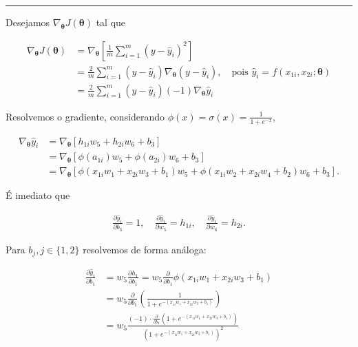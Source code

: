 \documentclass[
  a4paperpaper,
]{article}
\begin{document}
\begin{center}\rule{0.5\linewidth}{0.5pt}\end{center}

Desejamos \(\nabla_{\boldsymbol{\theta}}J(\boldsymbol{\theta})\) tal que

\begin{align}
  \nabla_{\boldsymbol{\theta}}J(\boldsymbol{\theta}) &= \nabla_{\boldsymbol{\theta}} \left[ \frac{1}{m} \sum\limits^m_{i = 1} (y - \hat{y}_i)^2 \right] \nonumber \\
  &= \frac{2}{m} \sum\limits^m_{i = 1} (y - \hat{y}_i) \nabla_{\boldsymbol{\theta}} (y - \hat{y}_i), \quad \text{pois } \hat{y}_i = f(x_{1i}, x_{2i}; \boldsymbol{\theta}) \nonumber \\
  &= \frac{2}{m} \sum\limits^m_{i = 1} (y - \hat{y}_i) (-1) \nabla_{\boldsymbol{\theta}} \hat{y}_i \label{101}
\end{align}

Resolvemos o gradiente, considerando
\(\phi(x) = \sigma(x) = \frac{1}{1+ e^{-x}}\),

\begin{align*}
  \nabla_{\boldsymbol{\theta}} \hat{y}_i &= \nabla_{\boldsymbol{\theta}} \left[ h_{1i} w_5 + h_{2i} w_6 + b_3 \right] \\
  &= \nabla_{\boldsymbol{\theta}} \left[ \phi(a_{1i}) w_5 + \phi(a_{2i}) w_6 + b_3 \right] \\
  &= \nabla_{\boldsymbol{\theta}} \left[ \phi(x_{1i} w_1 + x_{2i} w_3 + b_1) w_5 + \phi(x_{1i} w_2 + x_{2i} w_4 + b_2) w_6 + b_3 \right].
\end{align*}

É imediato que

\begin{align*}
  \frac{\partial \hat{y}_i}{\partial b_3} = 1, \quad \frac{\partial \hat{y}_i}{\partial w_5} = h_{1i}, \quad \frac{\partial \hat{y}_i}{\partial w_6} = h_{2i}.
\end{align*}

Para \(b_j, j \in \{1, 2\}\) resolvemos de forma análoga:

\begin{align*}
\frac{\partial \hat{y}_i}{\partial b_1} &= w_5 \frac{\partial h_1}{\partial b_1} = w_5 \frac{\partial}{\partial b_1} \phi(x_{1i} w_1 + x_{2i} w_3 + b_1) \\  
&= w_5 \frac{\partial}{\partial b_1} \left( \frac{1}{1+ e^{-(x_{1i} w_1 + x_{2i} w_3 + b_1)}} \right) \\  
&= w_5 \frac{(-1) \cdot \frac{\partial}{\partial b_1} \left(1+ e^{-(x_{1i} w_1 + x_{2i} w_3 + b_1)} \right)}{\left(1+ e^{-(x_{1i} w_1 + x_{2i} w_3 + b_1)} \right)^2}
\end{align*}
\end{document}
